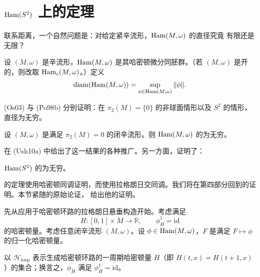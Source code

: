 \section{\texorpdfstring{$\operatorname{Ham}(S^2)$}{Ham(S2)} 上的\personPolterovich{}定理}
\label{sec:polterovich-Ham-S2}

联系\personHofer{}距离，一个自然问题是：对给定紧辛流形，$\operatorname{Ham}(M,\omega)$ 的直径究竟
有限还是无限？

\begin{definition}[\personHofer{}直径]
\label{def:hofer-diameter}
设 $(M,\omega)$ 是辛流形，$\operatorname{Ham}(M,\omega)$ 是其哈密顿微分同胚群。（若
$(M,\omega)$ 是开的，则改取 $\operatorname{Ham}_c(M,\omega)$。）定义
\[
 \operatorname{diam}(\operatorname{Ham}(M,\omega))
 =\sup_{\phi\in\operatorname{Ham}(M,\omega)}\|\phi\|.
\]
\end{definition}

\personOstrover{} (Os03) 与\personPolterovich{} (Po98b) 分别证明：在
$\pi_2(M)=\{0\}$ 的非球面情形以及 $S^2$ 的情形，\personHofer{}直径为无穷。

\begin{theorem}[\personOstrover{}]
\label{thm:ostrover-hofer-infinite}
设 $(M,\omega)$ 是满足 $\pi_2(M)=0$ 的闭辛流形。则
$\operatorname{Ham}(M,\omega)$ 的\termHoferDiameter{}为无穷。
\end{theorem}

\personUsher{}在 (Ush10a) 中给出了这一结果的各种推广。另一方面，\personPolterovich{}证明了：

\begin{theorem}[\personPolterovich{}]
\label{thm:polterovich-hofer-S2-infinite}
$\operatorname{Ham}(S^2)$ 的\termHoferDiameter{}为无穷。
\end{theorem}

\personOstrover{}的定理使用哈密顿\personFloer{}同调证明，而\personPolterovich{}使用拉格朗日交\personFloer{}同调。我们将在第四部分回到\personOstrover{}的证明。本节紧随\personPolterovich{}的原始论证，
给出他的证明。

先从应用于哈密顿环路的拉格朗日悬垂构造开始。考虑满足
\[
 H:[0,1]\times M\to\mathbb R,
 \qquad \phi_H^1=\mathrm{id}
\]
的哈密顿量。考虑任意闭辛流形 $(M,\omega)$。设
$\phi\in\operatorname{Ham}(M,\omega)$，$F$ 是满足 $F\mapsto\phi$ 的归一化哈密顿量。

\begin{definition}
\label{def:periodic-hamiltonian-loops}
以 $\mathcal H_{\mathrm{loop}}$ 表示生成哈密顿环路的一周期哈密顿量 $H$（即
$H(t,x)=H(t+1,x)$）的集合；换言之，$\phi_H$ 满足
$\phi_H^1=\mathrm{id}$。
\end{definition}

